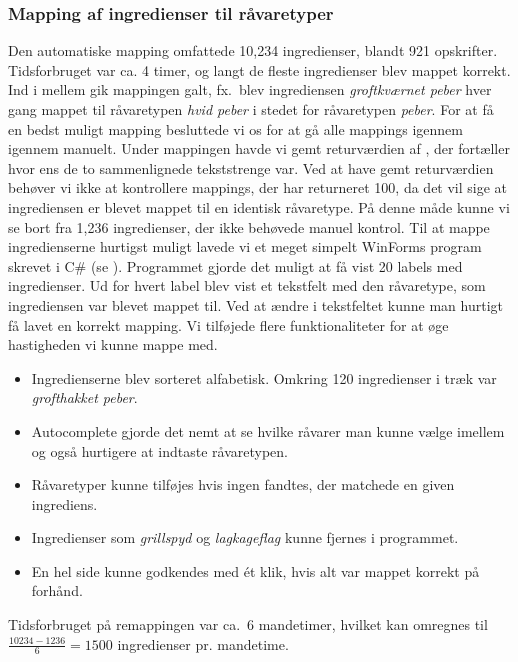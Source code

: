 \subsubsection{Mapping af ingredienser til råvaretyper}
Den automatiske mapping omfattede 10,234 ingredienser, blandt 921 opskrifter. Tidsforbruget var ca. 4 timer, og langt de fleste ingredienser blev mappet korrekt. Ind i mellem gik mappingen galt, fx.\ blev ingrediensen \textit{groftkværnet peber} hver gang mappet til råvaretypen \textit{hvid peber} i stedet for råvaretypen \textit{peber}. For at få en bedst muligt mapping besluttede vi os for at gå alle mappings igennem igennem manuelt. Under mappingen havde vi gemt returværdien af , der fortæller hvor ens de to sammenlignede tekststrenge var. Ved at have gemt returværdien behøver vi ikke at kontrollere mappings, der har returneret 100, da det vil sige at ingrediensen er blevet mappet til en identisk råvaretype. På denne måde kunne vi se bort fra 1,236 ingredienser, der ikke behøvede manuel kontrol.
Til at mappe ingredienserne hurtigst muligt lavede vi et meget simpelt WinForms program skrevet i C\# (se ). Programmet gjorde det muligt at få vist 20 labels med ingredienser. Ud for hvert label blev vist et tekstfelt med den råvaretype, som ingrediensen var blevet mappet til. Ved at ændre i tekstfeltet kunne man hurtigt få lavet en korrekt mapping. Vi tilføjede flere funktionaliteter for at øge hastigheden vi kunne mappe med.
\begin{itemize}
\item Ingredienserne blev sorteret alfabetisk. Omkring 120 ingredienser i træk var \textit{grofthakket peber}.
\item Autocomplete gjorde det nemt at se hvilke råvarer man kunne vælge imellem og også hurtigere at indtaste råvaretypen.
\item Råvaretyper kunne tilføjes hvis ingen fandtes, der matchede en given ingrediens.
\item Ingredienser som \fx \textit{grillspyd} og \textit{lagkageflag} kunne fjernes i programmet.
\item En hel side kunne godkendes med ét klik, hvis alt var mappet korrekt på forhånd.
\end{itemize}

Tidsforbruget på remappingen var ca.\ 6 mandetimer, hvilket kan omregnes til $\frac{10234 - 1236}{6} = 1500$ ingredienser pr. mandetime.
